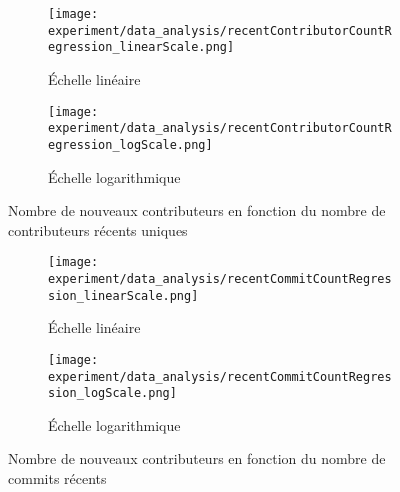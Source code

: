 \begin{figure}[ht]
    \centering
    \begin{subfigure}[t]{0.5\textwidth}
        \texttt{[image: experiment/data\_analysis/recentContributorCountRegression\_linearScale.png]}
        \caption{Échelle linéaire}
    \end{subfigure}%
    \begin{subfigure}[t]{0.5\textwidth}
        \texttt{[image: experiment/data\_analysis/recentContributorCountRegression\_logScale.png]}
        \caption{Échelle logarithmique}
    \end{subfigure}

    
    \caption{Nombre de nouveaux contributeurs en fonction du nombre de contributeurs récents uniques}
    \label{fig:contributorCount}
\end{figure}

\begin{figure}[ht]
    \centering
    \begin{subfigure}[t]{0.5\textwidth}
        \texttt{[image: experiment/data\_analysis/recentCommitCountRegression\_linearScale.png]}
        \caption{Échelle linéaire}
    \end{subfigure}%
    \begin{subfigure}[t]{0.5\textwidth}
        \texttt{[image: experiment/data\_analysis/recentCommitCountRegression\_logScale.png]}
        \caption{Échelle logarithmique}
    \end{subfigure}

    
    \caption{Nombre de nouveaux contributeurs en fonction du nombre de commits récents}
    \label{fig:commitCount}
\end{figure}

